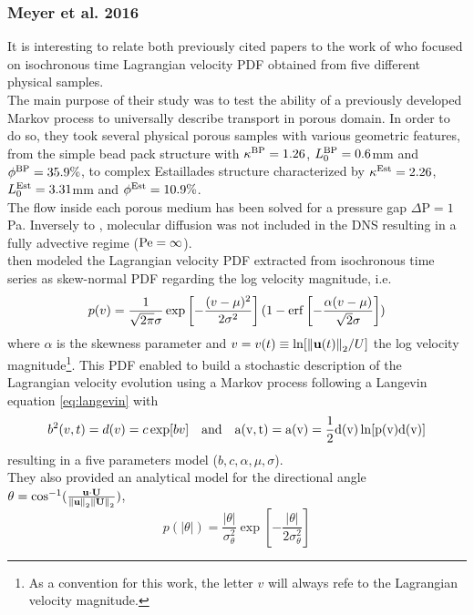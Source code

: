 \subsubsection{Meyer et al. 2016}
It is interesting to relate both previously cited papers to the work of \citet{Meyer2016} who focused on isochronous time Lagrangian velocity PDF obtained from five different physical samples. \\
The main purpose of their study was to test the ability of a previously developed Markov process to universally describe transport in porous domain.
In order to do so, they took several physical porous samples with various geometric features, from the simple bead pack structure with $\kappa^{\rm{BP}} = 1.26$, $L^{\rm{BP}}_0=0.6$mm and $\phi^{\rm{BP}}=35.9\%$, to complex Estaillades structure characterized by $\kappa^{\rm{Est}} = 2.26$, $L_0^{\rm{Est}}=3.31$mm and $\phi^{\rm{Est}}=10.9\%$.\\
The flow inside each porous medium has been solved for a pressure gap $\Delta\textrm{P}=1$Pa. 
Inversely to \citet{Dentz2017}, molecular diffusion was not included in the DNS resulting in a fully advective regime ($\mathrm{Pe}=\infty$).\\
\citeauthor{Meyer2016} then modeled the Lagrangian velocity PDF extracted from isochronous time series as skew-normal PDF regarding the log velocity magnitude, i.e.
\begin{equation}\label{eq:meyer_skew}
p(v)=\frac{1}{\sqrt{2\pi}\sigma}\exp\left[-\frac{(v-\mu)^2}{2\sigma^2}\right](1-\erf\left[-\frac{\alpha(v-\mu)}{\sqrt{2}\sigma}\right])
\end{equation}
where $\alpha$ is the skewness parameter and $v=v(t)\equiv\ln[\norm{\textbf{u}(t)}_2/U]$ the log velocity magnitude\footnote{As a convention for this work, the letter $v$ will always refe to the Lagrangian velocity magnitude.}.
This PDF enabled to build a stochastic description of the Lagrangian velocity evolution using a Markov process following a Langevin equation \eqref{eq:langevin} with 
\begin{equation}\label{eq:meyer_model_v}
b^2(v,t)=d(v)=c\exp[bv] \quad\rm{and}\quad a(v,t)=a(v)=\frac{1}{2}d(v)\ln[p(v)d(v)]
\end{equation}
resulting in a five parameters model ($b,c,\alpha,\mu,\sigma$).\\
They also provided an analytical model for the directional angle $\theta=\cos^{-1}(\frac{\textbf{u}\cdot\textbf{U}}{\norm{\textbf{u}}_2\norm{\textbf{U}}_2})$,
\[p(|\theta|)=\frac{|\theta|}{\sigma_\theta^2}\exp\left[-\frac{|\theta|}{2\sigma_\theta^2}\right]\]

